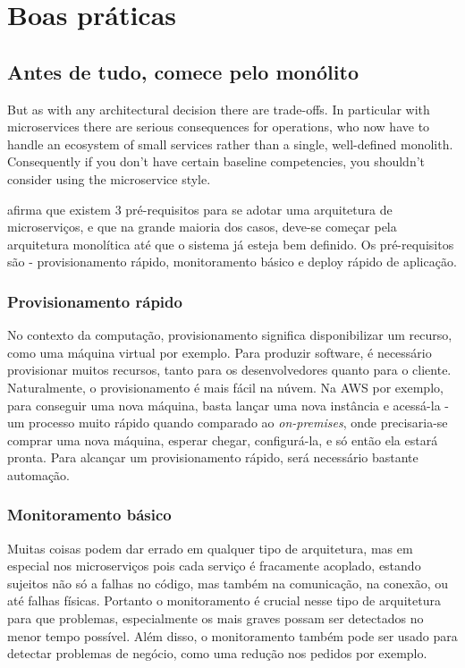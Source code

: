 \chapter{Boas práticas}\label{chapter-boas-praticas}

\section{Antes de tudo, comece pelo monólito}

\begin{citacao}
But as with any architectural decision there are trade-offs. In particular with microservices there are serious consequences for operations, who now have to handle an ecosystem of small services rather than a single, well-defined monolith. Consequently if you don't have certain baseline competencies, you shouldn't consider using the microservice style. \cite{MartinFowlerMicroservices}
\end{citacao}

 afirma que existem 3 pré-requisitos para se adotar uma arquitetura de microserviços, e que na grande maioria dos casos, deve-se começar pela arquitetura monolítica até que o sistema já esteja bem definido. Os pré-requisitos são - provisionamento rápido, monitoramento básico e deploy rápido de aplicação.

\subsection{Provisionamento rápido}

No contexto da computação, provisionamento significa disponibilizar um recurso, como uma máquina virtual por exemplo. Para produzir software, é necessário provisionar muitos recursos, tanto para os desenvolvedores quanto para o cliente. Naturalmente, o provisionamento é mais fácil na núvem. Na AWS por exemplo, para conseguir uma nova máquina, basta lançar uma nova instância e acessá-la - um processo muito rápido quando comparado ao \emph{on-premises}, onde precisaria-se comprar uma nova máquina, esperar chegar, configurá-la, e só então ela estará pronta. Para alcançar um provisionamento rápido, será necessário bastante automação.

\subsection{Monitoramento básico}

Muitas coisas podem dar errado em qualquer tipo de arquitetura, mas em especial nos microserviços pois cada serviço é fracamente acoplado, estando sujeitos não só a falhas no código, mas também na comunicação, na conexão, ou até falhas físicas. Portanto o monitoramento é crucial nesse tipo de arquitetura para que problemas, especialmente os mais graves possam ser detectados no menor tempo possível. Além disso, o monitoramento também pode ser usado para detectar problemas de negócio, como uma redução nos pedidos por exemplo.

